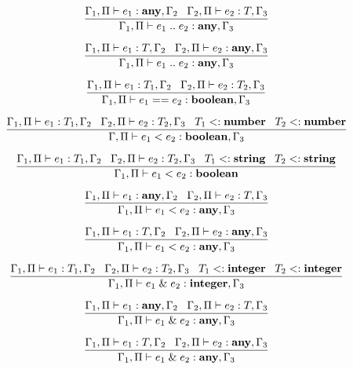 \[
\dfrac{\Gamma_{1}, \Pi \vdash e_{1}:\mathbf{any}, \Gamma_{2} \;\;\;
       \Gamma_{2}, \Pi \vdash e_{2}:T, \Gamma_{3}}
      {\Gamma_{1}, \Pi \vdash e_{1} \; {..} \; e_{2}:\mathbf{any}, \Gamma_{3}}
\]

\[
\dfrac{\Gamma_{1}, \Pi \vdash e_{1}:T, \Gamma_{2} \;\;\;
       \Gamma_{2}, \Pi \vdash e_{2}:\mathbf{any}, \Gamma_{3}}
      {\Gamma_{1}, \Pi \vdash e_{1} \; {..} \; e_{2}:\mathbf{any}, \Gamma_{3}}
\]

\[
\dfrac{\Gamma_{1}, \Pi \vdash e_{1}:T_{1}, \Gamma_{2} \;\;\;
       \Gamma_{2}, \Pi \vdash e_{2}:T_{2}, \Gamma_{3}}
      {\Gamma_{1}, \Pi \vdash e_{1} == e_{2}:\mathbf{boolean}, \Gamma_{3}}
\]

\[
\dfrac{\Gamma_{1}, \Pi \vdash e_{1}:T_{1}, \Gamma_{2} \;\;\;
       \Gamma_{2}, \Pi \vdash e_{2}:T_{2}, \Gamma_{3} \;\;\;
       T_{1} <: \mathbf{number} \;\;\;
       T_{2} <: \mathbf{number}}
      {\Gamma, \Pi \vdash e_{1} < e_{2}:\mathbf{boolean}, \Gamma_{3}}
\]

\[
\dfrac{\Gamma_{1}, \Pi \vdash e_{1}:T_{1}, \Gamma_{2} \;\;\;
       \Gamma_{2}, \Pi \vdash e_{2}:T_{2}, \Gamma_{3} \;\;\;
       T_{1} <: \mathbf{string} \;\;\;
       T_{2} <: \mathbf{string}}
      {\Gamma_{1}, \Pi \vdash e_{1} < e_{2}:\mathbf{boolean}}
\]

\[
\dfrac{\Gamma_{1}, \Pi \vdash e_{1}:\mathbf{any}, \Gamma_{2} \;\;\;
       \Gamma_{2}, \Pi \vdash e_{2}:T, \Gamma_{3}}
      {\Gamma_{1}, \Pi \vdash e_{1} < e_{2}:\mathbf{any}, \Gamma_{3}}
\]

\[
\dfrac{\Gamma_{1}, \Pi \vdash e_{1}:T, \Gamma_{2} \;\;\;
       \Gamma_{2}, \Pi \vdash e_{2}:\mathbf{any}, \Gamma_{3}}
      {\Gamma_{1}, \Pi \vdash e_{1} < e_{2}:\mathbf{any}, \Gamma_{3}}
\]

\[
\dfrac{\Gamma_{1}, \Pi \vdash e_{1}:T_{1}, \Gamma_{2} \;\;\;
       \Gamma_{2}, \Pi \vdash e_{2}:T_{2}, \Gamma_{3} \;\;\;
       T_{1} <: \mathbf{integer} \;\;\;
       T_{2} <: \mathbf{integer}}
      {\Gamma_{1}, \Pi \vdash e_{1} \;\&\; e_{2}:\mathbf{integer}, \Gamma_{3}}
\]

\[
\dfrac{\Gamma_{1}, \Pi \vdash e_{1}:\mathbf{any}, \Gamma_{2} \;\;\;
       \Gamma_{2}, \Pi \vdash e_{2}:T, \Gamma_{3}}
      {\Gamma_{1}, \Pi \vdash e_{1} \;\&\; e_{2}:\mathbf{any}, \Gamma_{3}}
\]

\[
\dfrac{\Gamma_{1}, \Pi \vdash e_{1}:T, \Gamma_{2} \;\;\;
       \Gamma_{2}, \Pi \vdash e_{2}:\mathbf{any}, \Gamma_{3}}
      {\Gamma_{1}, \Pi \vdash e_{1} \;\&\; e_{2}:\mathbf{any}, \Gamma_{3}}
\]

